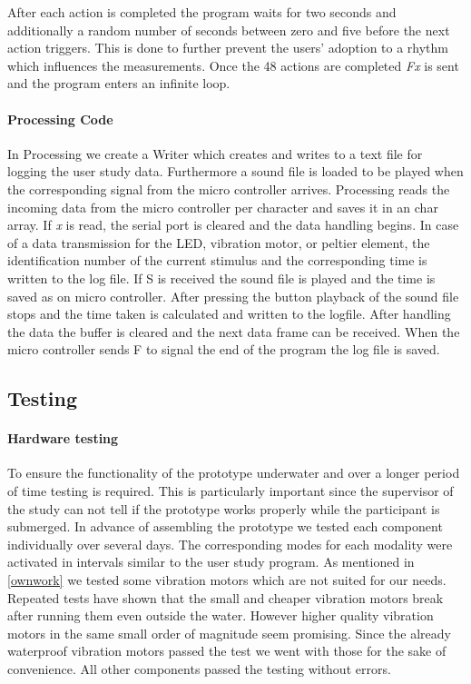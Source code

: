 After each action is completed the program waits for two seconds and additionally a random number of seconds between zero and five before the next action triggers.
This is done to further prevent the users' adoption to a rhythm which influences the measurements.
Once the 48 actions are completed \emph{Fx} is sent and the program enters an infinite loop.

\paragraph{Processing Code}
In Processing we create a Writer which creates and writes to a text file for logging the user study data.
Furthermore a sound file is loaded to be played when the corresponding signal from the micro controller arrives. 
Processing reads the incoming data from the micro controller per character and saves it in an char array. 
If \emph{x} is read, the serial port is cleared and the data handling begins. 
In case of a data transmission for the LED, vibration motor, or peltier element, the identification number of the current stimulus and the corresponding time is written to the log file. 
If S is received the sound file is played and the time is saved as on micro controller. 
After pressing the button playback of the sound file stops and the time taken is calculated and written to the logfile. 
After handling the data the buffer is cleared and the next data frame can be received. 
When the micro controller sends F to signal the end of the program the log file is saved.

\subsection{Testing}
\paragraph{Hardware testing}
To ensure the functionality of the prototype underwater and over a longer period of time testing is required. 
This is particularly important since the supervisor of the study can not tell if the prototype works properly while the participant is submerged. 
In advance of assembling the prototype we tested each component individually over several days. 
The corresponding modes for each modality were activated in intervals similar to the user study program. 
As mentioned in \ref{ownwork} we tested some vibration motors which are not suited for our needs. 
Repeated tests have shown that the small and cheaper vibration motors break after running them even outside the water. 
However higher quality vibration motors in the same small order of magnitude seem promising. 
Since the already waterproof vibration motors passed the test we went with those for the sake of convenience. 
All other components passed the testing without errors.

